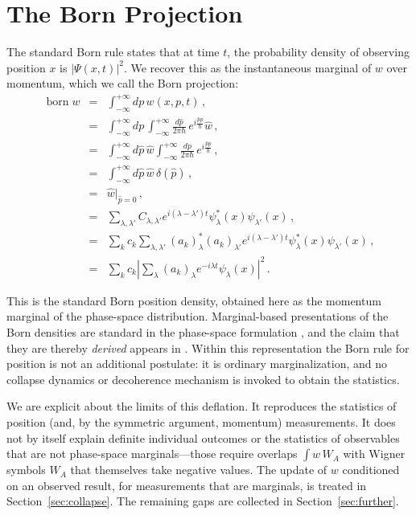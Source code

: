 \documentclass[12pt]{article}
\DeclareMathOperator\born{born}
\begin{document}
\section{The Born Projection}\label{sec:born}

The standard Born rule states that at time $t$, the probability density of observing position $x$ is $|\Psi(x,t)|^2$.  We recover this as the instantaneous marginal of $w$ over momentum, which we call the Born projection:
\begin{eqnarray}
\born w &=& \int_{-\infty}^{+\infty} dp \, w(x,p,t) \,, \\
&=& \int_{-\infty}^{+\infty} dp \, \int_{-\infty}^{+\infty} \frac{d\hat{p}}{2\pi \hbar} \, e^{i \frac{\hat{p} p}{\hbar}} \hat{w} \,, \\
&=& \int_{-\infty}^{+\infty} d\hat{p} \, \hat{w} \int_{-\infty}^{+\infty} \frac{dp}{2\pi \hbar} \, e^{i \frac{\hat{p} p}{\hbar}}   \,, \\
&=& \int_{-\infty}^{+\infty} d\hat{p} \, \hat{w} \,\delta(\hat{p}) \,, \\
&=& \hat{w}|_{\hat{p}=0} \,, \\
&=& \sum_{\lambda,\lambda'} C_{\lambda,\lambda'} e^{i(\lambda-\lambda')t} \psi_\lambda^*(x)\psi_{\lambda'}(x) \,, \\
&=& \sum_k c_k \sum_{\lambda,\lambda'} (a_k)_{\lambda}^* (a_k)_{\lambda'} e^{i(\lambda-\lambda')t} \psi_\lambda^*(x)\psi_{\lambda'}(x) \,, \\
&=& \sum_k c_k \left| \sum_{\lambda} (a_k)_{\lambda} e^{-i\lambda t} \psi_\lambda(x) \right|^2 \,.
\end{eqnarray}

This is the standard Born position density, obtained here as the momentum marginal of the phase-space distribution.  Marginal-based presentations of the Born densities are standard in the phase-space formulation \cite{case2008,hirshfeld2002}, and the claim that they are thereby \emph{derived} appears in \cite{carnovali2005}.  Within this representation the Born rule for position is not an additional postulate: it is ordinary marginalization, and no collapse dynamics or decoherence mechanism \cite{zurek2003} is invoked to obtain the statistics.

We are explicit about the limits of this deflation.  It reproduces the statistics of position (and, by the symmetric argument, momentum) measurements.  It does not by itself explain definite individual outcomes or the statistics of observables that are not phase-space marginals---those require overlaps $\int w\, W_A$ with Wigner symbols $W_A$ that themselves take negative values.  The update of $w$ conditioned on an observed result, for measurements that are marginals, is treated in Section~\ref{sec:collapse}.  The remaining gaps are collected in Section~\ref{sec:further}.
\end{document}
